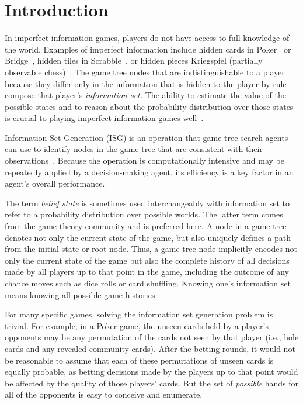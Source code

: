 \documentclass[10pt, conference, compsocconf]{IEEEtran}
\begin{document}
\section{Introduction}
In imperfect information games, players do not have access to full knowledge of
the world. Examples of imperfect information include hidden cards in
Poker~\cite{billings02challenge} or Bridge~\cite{ginsberg96partition}, hidden
tiles in Scrabble~\cite{richards07opponent}, or hidden pieces 
Kriegspiel (partially observable chess)~\cite{li94chess}. The game tree nodes
that are indistinguishable to a player because they differ only in the
information that is hidden to the player by rule compose that player's {\em
information set.}  The ability to estimate the value of the possible states and
to reason about the probability distribution over those states is crucial to
playing imperfect information games well~\cite{schofield12hyperplay}. 

Information Set Generation (ISG) is an operation that game tree search agents
can use to identify nodes in the game tree that are consistent with their
observations~\cite{richards12information}.  Because the operation is
computationally intensive and may be repeatedly applied by a decision-making
agent, its efficiency is a key factor in an agent's overall performance.   

The term {\em belief state} is sometimes used interchangeably with information
set to refer to a probability distribution over possible worlds.  The latter
term comes from the game theory community and is preferred here.  A node in a
game tree denotes not only the current state of the game, but also uniquely
defines a path from the initial state or root node.  Thus, a game tree node
implicitly encodes not only the current state of the game but also the complete
history of all decisions made by all players up to that point in the game,
including the outcome of any chance moves such as dice rolls or card shuffling.
Knowing one's information set means knowing all possible game histories.

For many specific games, solving the information set generation problem is
trivial.  For example, in a Poker game, the unseen cards held by a player's
opponents may be any permutation of the cards not seen by that player (i.e.,
hole cards and any revealed community cards).  After the betting rounds, it
would not be reasonable to assume that each of these permutations of unseen
cards is equally probable, as betting decisions made by the players up to that
point would be affected by the quality of those players' cards.  But the set of
{\em possible} hands for all of the opponents is easy to conceive and
enumerate.
\end{document}
